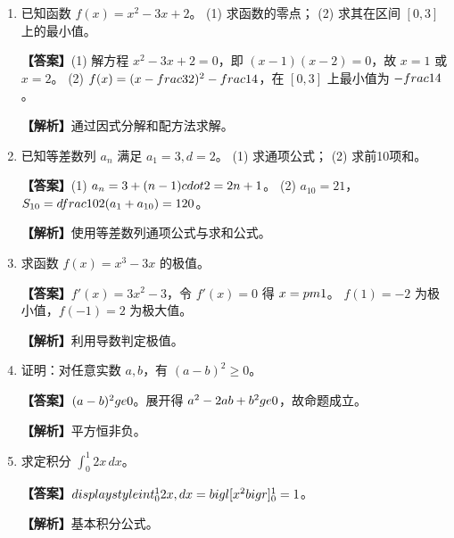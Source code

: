 \documentclass[UTF8,a4paper]{ctexart}
\begin{document}
\begin{enumerate}[leftmargin=2em,itemsep=0.8em]


\item 已知函数 $f(x)=x^2-3x+2$。
(1) 求函数的零点；
(2) 求其在区间 $[0,3]$ 上的最小值。


\par\noindent\textbf{【答案】}(1) 解方程 $x^2-3x+2=0$，即 $(x-1)(x-2)=0$，故 $x=1$ 或 $x=2$。
(2) $f(x)=(x-\\frac{3}{2})^2-\\frac{1}{4}$，在 $[0,3]$ 上最小值为 $-\\frac{1}{4}$。

\par\noindent\textbf{【解析】}通过因式分解和配方法求解。



\item 已知等差数列 $a_n$ 满足 $a_1=3,d=2$。
(1) 求通项公式；
(2) 求前10项和。


\par\noindent\textbf{【答案】}(1) $a_n=3+(n-1)\\cdot 2=2n+1$。
(2) $a_{10}=21$，$S_{10}=\\dfrac{10}{2}(a_1+a_{10})=120$。

\par\noindent\textbf{【解析】}使用等差数列通项公式与求和公式。



\item 求函数 $f(x)=x^3-3x$ 的极值。


\par\noindent\textbf{【答案】}$f'(x)=3x^2-3$，令 $f'(x)=0$ 得 $x=\\pm 1$。
$f(1)=-2$ 为极小值，$f(-1)=2$ 为极大值。

\par\noindent\textbf{【解析】}利用导数判定极值。



\item 证明：对任意实数 $a,b$，有
$(a-b)^2 \ge 0$。


\par\noindent\textbf{【答案】}$(a-b)^2\\ge 0$。展开得 $a^2-2ab+b^2\\ge 0$，故命题成立。

\par\noindent\textbf{【解析】}平方恒非负。



\item 求定积分 $\int_0^1 2x\,dx$。


\par\noindent\textbf{【答案】}$\\displaystyle\\int_0^1 2x\\,dx = \\bigl[x^2\\bigr]_0^1 = 1$。

\par\noindent\textbf{【解析】}基本积分公式。


\end{enumerate}
\vspace{1em}
\end{document}
